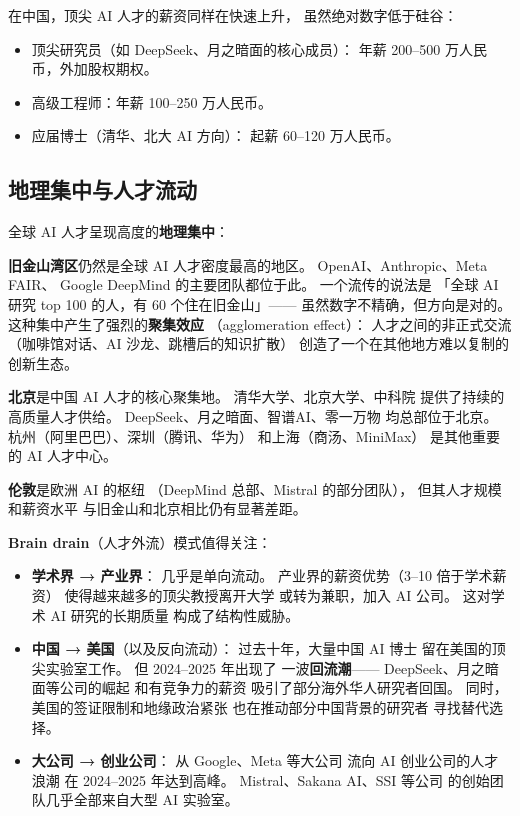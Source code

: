 在中国，顶尖 AI 人才的薪资同样在快速上升，
虽然绝对数字低于硅谷：
\begin{itemize}[noitemsep]
  \item 顶尖研究员（如 DeepSeek、月之暗面的核心成员）：
        年薪 200--500 万人民币，外加股权期权。
  \item 高级工程师：年薪 100--250 万人民币。
  \item 应届博士（清华、北大 AI 方向）：
        起薪 60--120 万人民币。
\end{itemize}

\subsection{地理集中与人才流动}

全球 AI 人才呈现高度的\textbf{地理集中}：

\textbf{旧金山湾区}仍然是全球 AI 人才密度最高的地区。
OpenAI、Anthropic、Meta FAIR、
Google DeepMind 的主要团队都位于此。
一个流传的说法是
「全球 AI 研究 top 100 的人，有 60 个住在旧金山」——
虽然数字不精确，但方向是对的。
这种集中产生了强烈的\textbf{聚集效应}
（agglomeration effect）：
人才之间的非正式交流
（咖啡馆对话、AI 沙龙、跳槽后的知识扩散）
创造了一个在其他地方难以复制的创新生态。

\textbf{北京}是中国 AI 人才的核心聚集地。
清华大学、北京大学、中科院
提供了持续的高质量人才供给。
DeepSeek、月之暗面、智谱AI、零一万物
均总部位于北京。
杭州（阿里巴巴）、深圳（腾讯、华为）
和上海（商汤、MiniMax）
是其他重要的 AI 人才中心。

\textbf{伦敦}是欧洲 AI 的枢纽
（DeepMind 总部、Mistral 的部分团队），
但其人才规模和薪资水平
与旧金山和北京相比仍有显著差距。

\textbf{Brain drain}（人才外流）模式值得关注：
\begin{itemize}[noitemsep]
  \item \textbf{学术界 → 产业界}：
        几乎是单向流动。
        产业界的薪资优势（3--10 倍于学术薪资）
        使得越来越多的顶尖教授离开大学
        或转为兼职，加入 AI 公司。
        这对学术 AI 研究的长期质量
        构成了结构性威胁。
  \item \textbf{中国 → 美国}（以及反向流动）：
        过去十年，大量中国 AI 博士
        留在美国的顶尖实验室工作。
        但 2024--2025 年出现了
        一波\textbf{回流潮}——
        DeepSeek、月之暗面等公司的崛起
        和有竞争力的薪资
        吸引了部分海外华人研究者回国。
        同时，美国的签证限制和地缘政治紧张
        也在推动部分中国背景的研究者
        寻找替代选择。
  \item \textbf{大公司 → 创业公司}：
        从 Google、Meta 等大公司
        流向 AI 创业公司的人才浪潮
        在 2024--2025 年达到高峰。
        Mistral、Sakana AI、SSI 等公司
        的创始团队几乎全部来自大型 AI 实验室。
\end{itemize}

